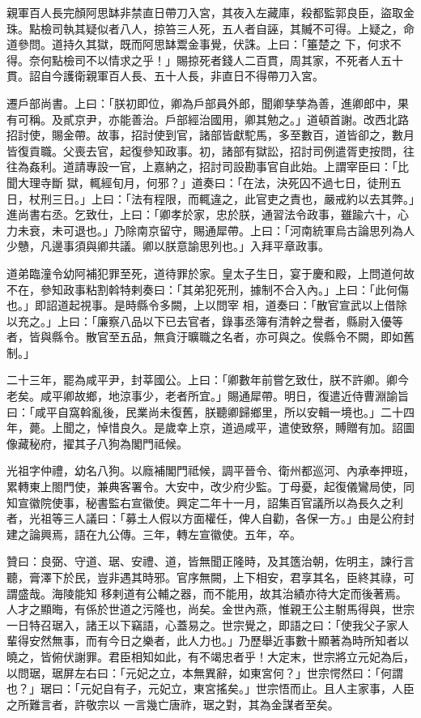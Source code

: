 \begin{pinyinscope}
 親軍百人長完顏阿思缽非禁直日帶刀入宮，其夜入左藏庫，殺都監郭良臣，盜取金珠。點檢司執其疑似者八人，掠笞三人死，五人者自誣，其贓不可得。上疑之，命道參問。道持久其獄，既而阿思缽鬻金事覺，伏誅。上曰：「箠楚之
 下，何求不得。奈何點檢司不以情求之乎！」賜掠死者錢人二百貫，周其家，不死者人五十貫。詔自今護衛親軍百人長、五十人長，非直日不得帶刀入宮。



 遷戶部尚書。上曰：「朕初即位，卿為戶部員外郎，聞卿孳孳為善，進卿郎中，果有可稱。及貳京尹，亦能善治。戶部經治國用，卿其勉之。」道頓首謝。改西北路招討使，賜金帶。故事，招討使到官，諸部皆獻駝馬，多至數百，道皆卻之，數月皆復貢職。父喪去官，起復參知政事。初，諸部有獄訟，招討司例遣胥吏按問，往往為姦利。道請專設一官，上嘉納之，招討司設勘事官自此始。上謂宰臣曰：「比聞大理寺斷
 獄，輒經旬月，何邪？」道奏曰：「在法，決死囚不過七日，徒刑五日，杖刑三日。」上曰：「法有程限，而輒違之，此官吏之責也，嚴戒約以去其弊。」進尚書右丞。乞致仕，上曰：「卿孝於家，忠於朕，通習法令政事，雖踰六十，心力未衰，未可退也。」乃除南京留守，賜通犀帶。上曰：「河南統軍烏古論思列為人少戇，凡邊事須與卿共議。卿以朕意諭思列也。」入拜平章政事。



 道弟臨潼令幼阿補犯罪至死，道待罪於家。皇太子生日，宴于慶和殿，上問道何故不在，參知政事粘割斡特剌奏曰：「其弟犯死刑，據制不合入內。」上曰：「此何傷也。」即詔道起視事。是時縣令多闕，上以問宰
 相，道奏曰：「散官宣武以上借除以充之。」上曰：「廉察八品以下已去官者，錄事丞簿有清幹之譽者，縣尉入優等者，皆與縣令。散官至五品，無貪汙曠職之名者，亦可與之。俟縣令不闕，即如舊制。」



 二十三年，罷為咸平尹，封莘國公。上曰：「卿數年前嘗乞致仕，朕不許卿。卿今老矣。咸平卿故鄉，地涼事少，老者所宜。」賜通犀帶。明日，復遣近侍曹淵諭旨曰：「咸平自窩斡亂後，民業尚未復舊，朕聽卿歸鄉里，所以安輯一境也。」二十四年，薨。上聞之，悼惜良久。是歲幸上京，道過咸平，遣使致祭，賻贈有加。詔圖像藏秘府，擢其子八狗為閣門祗候。



 光祖字仲禮，幼名八狗。以廕補閣門祗候，調平晉令、衛州都巡河、內承奉押班，累轉東上閤門使，兼典客署令。大安中，改少府少監。丁母憂，起復儀鸞局使，同知宣徽院使事，秘書監右宣徽使。興定二年十一月，詔集百官議所以為長久之利者，光祖等三人議曰：「募土人假以方面權任，俾人自勸，各保一方。」由是公府封建之論興焉，語在九公傳。三年，轉左宣徽使。五年，卒。



 贊曰：良弼、守道、琚、安禮、道，皆無聞正隆時，及其簉治朝，佐明主，諫行言聽，膏澤下於民，豈非遇其時邪。官序無闕，上下相安，君享其名，臣終其祿，可謂盛哉。海陵能知
 移剌道有公輔之器，而不能用，故其治績亦待大定而後著焉。人才之顯晦，有係於世道之污隆也，尚矣。金世內燕，惟親王公主駙馬得與，世宗一日特召琚入，諸王以下竊語，心蓋易之。世宗覺之，即語之曰：「使我父子家人輩得安然無事，而有今日之樂者，此人力也。」乃歷舉近事數十顯著為時所知者以曉之，皆俯伏謝罪。君臣相知如此，有不竭忠者乎！大定末，世宗將立元妃為后，以問琚，琚屏左右曰：「元妃之立，本無異辭，如東宮何？」世宗愕然曰：「何謂也？」琚曰：「元妃自有子，元妃立，東宮搖矣。」世宗悟而止。且人主家事，人臣之所難言者，許敬宗以
 一言幾亡唐祚，琚之對，其為金謀者至矣。



\end{pinyinscope}